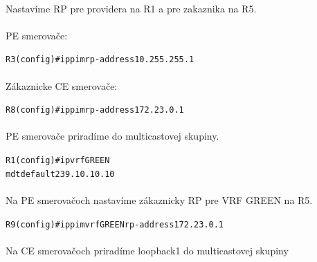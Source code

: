 \documentclass[12pt,twoside,a4paper]{report}
\begin{document}
\paragraph{}
Nastavíme RP pre providera na R1 a pre zakaznika na R5.

\paragraph{}
PE smerovače:
\noindent
{\selectfont
\begin{small}
\begin{alltt}
R3(config)#ip pim rp-address 10.255.255.1
\end{alltt}
\end{small}
}

\paragraph{}
Zákaznicke CE smerovače:
\noindent
{\selectfont
\begin{small}
\begin{alltt}
R8(config)#ip pim rp-address 172.23.0.1
\end{alltt}
\end{small}
}


\paragraph{}
PE smerovače priradíme do multicastovej skupiny.

\noindent
{\selectfont
\begin{small}
\begin{alltt}
R1(config)#ip vrf GREEN
  mdt default 239.10.10.10
\end{alltt}
\end{small}
}

\paragraph{}
Na PE smerovačoch nastavíme zákaznicky RP pre VRF GREEN na R5.

\noindent
{\selectfont
\begin{small}
\begin{alltt}
R9(config)#ip pim vrf GREEN rp-address 172.23.0.1
\end{alltt}
\end{small}
}


\paragraph{}
Na CE smerovačoch priradíme loopback1 do multicastovej skupiny
\end{document}
